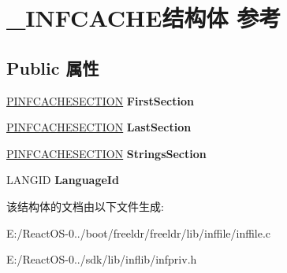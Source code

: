 \hypertarget{struct___i_n_f_c_a_c_h_e}{}\section{\+\_\+\+I\+N\+F\+C\+A\+C\+H\+E结构体 参考}
\label{struct___i_n_f_c_a_c_h_e}
\subsection*{Public 属性}
\begin{DoxyCompactItemize}
\item 
\mbox{\label{struct___i_n_f_c_a_c_h_e_a07c1d3d7bf6f355b908466ab9259674e}} 
\hyperlink{struct___i_n_f_c_a_c_h_e_s_e_c_t_i_o_n}{P\+I\+N\+F\+C\+A\+C\+H\+E\+S\+E\+C\+T\+I\+ON} {\bfseries First\+Section}
\item 
\mbox{\label{struct___i_n_f_c_a_c_h_e_a6829ba4100f316fa5c36bf53585c358e}} 
\hyperlink{struct___i_n_f_c_a_c_h_e_s_e_c_t_i_o_n}{P\+I\+N\+F\+C\+A\+C\+H\+E\+S\+E\+C\+T\+I\+ON} {\bfseries Last\+Section}
\item 
\mbox{\label{struct___i_n_f_c_a_c_h_e_a7c0c14c46f95a0c497536b263f5a4aca}} 
\hyperlink{struct___i_n_f_c_a_c_h_e_s_e_c_t_i_o_n}{P\+I\+N\+F\+C\+A\+C\+H\+E\+S\+E\+C\+T\+I\+ON} {\bfseries Strings\+Section}
\item 
\mbox{\label{struct___i_n_f_c_a_c_h_e_af73e330671465a9aacdedb927d1f7a4f}} 
L\+A\+N\+G\+ID {\bfseries Language\+Id}
\end{DoxyCompactItemize}


该结构体的文档由以下文件生成\+:\begin{DoxyCompactItemize}
\item 
E\+:/\+React\+O\+S-\/0../boot/freeldr/freeldr/lib/inffile/inffile.\+c\item 
E\+:/\+React\+O\+S-\/0../sdk/lib/inflib/infpriv.\+h\end{DoxyCompactItemize}
